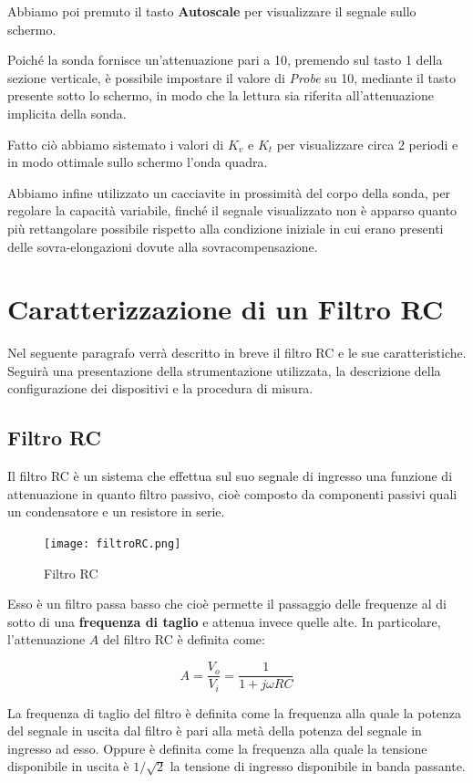 Abbiamo poi premuto il tasto \textbf{Autoscale} per visualizzare il segnale sullo schermo.

Poiché la sonda fornisce un'attenuazione pari a 10, premendo sul tasto 1 della sezione verticale, è possibile impostare il valore di \emph{Probe} su 10, mediante il tasto presente sotto lo schermo, in modo che la lettura sia riferita all'attenuazione implicita della sonda.

Fatto ciò abbiamo sistemato i valori di $K_v$ e $K_t$ per visualizzare circa 2 periodi e in modo ottimale sullo schermo l'onda quadra.

Abbiamo infine utilizzato un cacciavite in prossimità del corpo della sonda, per regolare la capacità variabile, finché il segnale visualizzato non è apparso quanto più rettangolare possibile rispetto alla condizione iniziale in cui erano presenti delle sovra-elongazioni dovute alla sovracompensazione.


\clearpage
\section{Caratterizzazione di un Filtro RC} \label{sec:filtroRC}
Nel seguente paragrafo verrà descritto in breve il filtro RC e le sue caratteristiche. Seguirà una presentazione della strumentazione utilizzata, la descrizione della configurazione dei dispositivi e la procedura di misura.

\subsection{Filtro RC}
Il filtro RC è un sistema che effettua sul suo segnale di ingresso una funzione di attenuazione in quanto filtro passivo, cioè composto da componenti passivi quali un condensatore e un resistore in serie.

\begin{figure}[h]
    \centering
    \texttt{[image: filtroRC.png]}
    \caption{Filtro RC}
    \label{fig:filtroRC}
\end{figure}
\FloatBarrier

Esso è un filtro passa basso che cioè permette il passaggio delle frequenze al di sotto di una \textbf{frequenza di taglio} e attenua invece quelle alte. In particolare, l'attenuazione $A$ del filtro RC è definita come:

\[A=\frac{V_o}{V_i}=\frac{1}{1+j\omega RC}\]

La frequenza di taglio del filtro è definita come la frequenza alla quale la potenza del segnale in uscita dal filtro è pari alla metà della potenza del segnale in ingresso ad esso. Oppure è definita come la frequenza alla quale la tensione disponibile in uscita è $1/\sqrt{2}$ la tensione di ingresso disponibile in banda passante.

